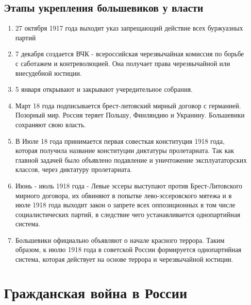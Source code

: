 \documentclass[a4paper]{article}
\begin{document}
\subsection{Этапы укрепления большевиков у власти}
\begin{enumerate}
    \item 27 октября 1917 года выходит указ запрещающий действие всех буржуазных партий
    \item 7 декабря создается ВЧК - всероссийская черезвычайная комиссия по борьбе с саботажем и контреволюцией. Она получает права черезвычайной или внесудебной юстиции.
    \item 5 января открывают и закрывают учередительное собрания.
    \item Март 18 года подписывается брест-литовский мирный договор с германией. Позорный мир. Россия теряет Польшу, Финляндию и Укранину. Большевики сохраняют свою власть.
    \item В Июле 18 года принимается первая совесткая конституция 1918 года, которая получила название конституции диктатуры пролетариата. Так как главной задачей было объявлено подавление и уничтожение эксплуататорских классов, через диктатуру пролетариата.
    \item Июнь - июль 1918 года - Левые эссеры выступают против Брест-Литовского мирного договора, их обвиняют в попытке лево-эссеровского мятежа и в июле 1918 года выходит закон о запрете всех оппозиционных в том числе социалистических партий, в следствие чего устанавливается однопартийная система.
    \item Большевики официально объявляют о начале красного террора. Таким образом, к июлю 1918 года в советской России формируется однопартийная система, которая действует на основе террора и черезвычайной юстиции.
\end{enumerate}

\section{Гражданская война в России}
\end{document}
